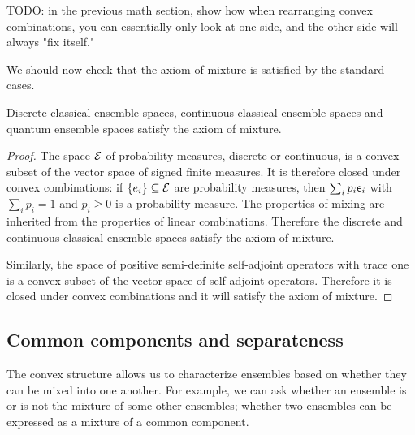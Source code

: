 TODO: in the previous math section, show how when rearranging convex combinations, you can essentially only look at one side, and the other side will always "fix itself."

We should now check that the axiom of mixture is satisfied by the standard cases.

\begin{mathSection}
\begin{prop}
	Discrete classical ensemble spaces, continuous classical ensemble spaces and quantum ensemble spaces satisfy the axiom of mixture.
\end{prop}

\begin{proof}
	The space $\mathcal{E}$ of probability measures, discrete or continuous, is a convex subset of the vector space of signed finite measures. It is therefore closed under convex combinations: if $\{e_i\} \subseteq \mathcal{E}$ are probability measures, then $\sum_i p_i \mathsf{e}_i$ with $\sum_i p_i = 1$ and $p_i \geq 0$ is a probability measure. The properties of mixing are inherited from the properties of linear combinations. Therefore the discrete and continuous classical ensemble spaces satisfy the axiom of mixture.
	
	Similarly, the space of positive semi-definite self-adjoint operators with trace one is a convex subset of the vector space of self-adjoint operators. Therefore it is closed under convex combinations and it will satisfy the axiom of mixture.
\end{proof}
\end{mathSection}

\subsection{Common components and separateness}

The convex structure allows us to characterize ensembles based on whether they can be mixed into one another. For example, we can ask whether an ensemble is or is not the mixture of some other ensembles; whether two ensembles can be expressed as a mixture of a common component.

